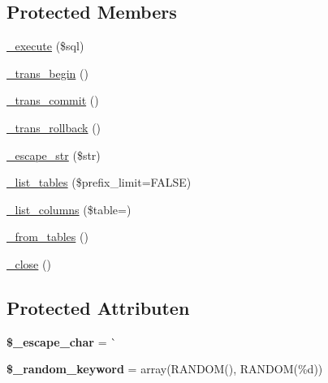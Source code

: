 \subsection*{Protected Members}
\begin{DoxyCompactItemize}
\item 
\mbox{\hyperlink{class_c_i___d_b__cubrid__driver_a114ab675d89bf8324a41785fb475e86d}{\+\_\+execute}} (\$sql)
\item 
\mbox{\hyperlink{class_c_i___d_b__cubrid__driver_ac81ac882c1d54347d810199a15856aac}{\+\_\+trans\+\_\+begin}} ()
\item 
\mbox{\hyperlink{class_c_i___d_b__cubrid__driver_a6fe7f373e0b11cfae23a5f41c0b35dda}{\+\_\+trans\+\_\+commit}} ()
\item 
\mbox{\hyperlink{class_c_i___d_b__cubrid__driver_ad49a116b0776c26b53114c9093fd102a}{\+\_\+trans\+\_\+rollback}} ()
\item 
\mbox{\hyperlink{class_c_i___d_b__cubrid__driver_af8ef0237bfcdb19215b63fff769e7a55}{\+\_\+escape\+\_\+str}} (\$str)
\item 
\mbox{\hyperlink{class_c_i___d_b__cubrid__driver_a435c0f3ce54fe7daa178baa8532ebd54}{\+\_\+list\+\_\+tables}} (\$prefix\+\_\+limit=F\+A\+L\+SE)
\item 
\mbox{\hyperlink{class_c_i___d_b__cubrid__driver_a7ccb7f9c301fe7f0a9db701254142b63}{\+\_\+list\+\_\+columns}} (\$table=\textquotesingle{}\textquotesingle{})
\item 
\mbox{\hyperlink{class_c_i___d_b__cubrid__driver_aef43f7e3e7b71d337ff3724c5eb14f10}{\+\_\+from\+\_\+tables}} ()
\item 
\mbox{\hyperlink{class_c_i___d_b__cubrid__driver_a4d9082658000e5ede8312067c6dda9db}{\+\_\+close}} ()
\end{DoxyCompactItemize}
\subsection*{Protected Attributen}
\begin{DoxyCompactItemize}
\item 
\mbox{\label{class_c_i___d_b__cubrid__driver_aaec2fb0112850159063a8e47ad3aed6e}} 
{\bfseries \$\+\_\+escape\+\_\+char} = \textquotesingle{}\`{}\textquotesingle{}
\item 
\mbox{\label{class_c_i___d_b__cubrid__driver_a10213aa6e05f6d924d3277bb1d2fea00}} 
{\bfseries \$\+\_\+random\+\_\+keyword} = array(\textquotesingle{}R\+A\+N\+D\+OM()\textquotesingle{}, \textquotesingle{}R\+A\+N\+D\+OM(\%d)\textquotesingle{})
\end{DoxyCompactItemize}


